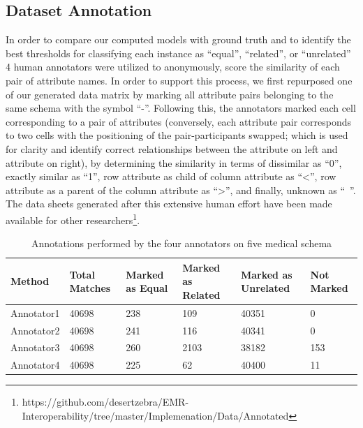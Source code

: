 \documentclass{ieeeaccess}
\begin{document}
\subsection{Dataset Annotation}
In order to compare our computed models with ground truth and to identify the best thresholds for classifying each instance as ``equal'', ``related'', or ``unrelated'' 4 human annotators were utilized to anonymously, score the similarity of each pair of attribute names. In order to support this process, we first repurposed one of our generated data matrix by marking all attribute pairs belonging to the same schema with the symbol ``-''. Following this, the annotators marked each cell corresponding to a pair of attributes (conversely, each attribute pair corresponds to two cells with the positioning of the pair-participants swapped; which is used for clarity and identify correct relationships between the attribute on left and attribute on right), by determining the similarity in terms of dissimilar as ``0'', exactly similar as ``1'', row attribute as child of column attribute as ``<'', row attribute as a parent of the column attribute as ``>'', and finally, unknown as ``~''. The data sheets generated after this extensive human effort have been made available for other researchers\footnote{https://github.com/desertzebra/EMR-Interoperability/tree/master/Implemenation/Data/Annotated}.

\begin{table}
	\centering
	\caption{Annotations performed by the four annotators on five medical schema}
	\label{tab:annotator_marking}
	\begin{tabular}{|l|l|l|l|l|l|}
		\hline
		Method     & Total Matches & Marked as Equal & Marked as Related & Marked as Unrelated & Not Marked \\ \hline
		Annotator1 & 40698         & 238             & 109               & 40351               & 0          \\
		Annotator2 & 40698         & 241             & 116               & 40341               & 0          \\
		Annotator3 & 40698         & 260             & 2103              & 38182               & 153        \\
		Annotator4 & 40698         & 225             & 62                & 40400               & 11         \\ \hline
	\end{tabular}
\end{table}
\end{document}
